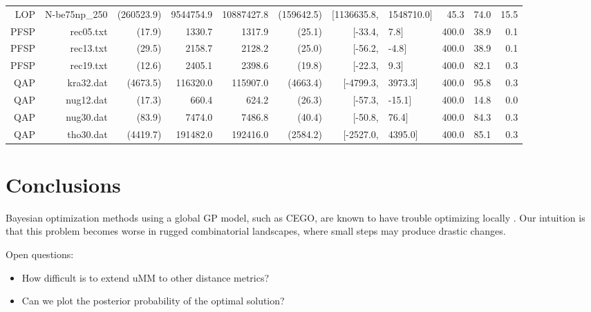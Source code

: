 \documentclass[runningheads]{llncs}
\begin{document}
\begin{table}[tb]
{\begin{tabular}{*{6}{r}rl*{3}{r}}
    LOP     & N-be75np\_250    & (260523.9)      & 9544754.9        & 10887427.8              & (159642.5) & $[$1136635.8, & 1548710.0$]$  & 45.3 & 74.0 & 15.5 \\
   PFSP     & rec05.txt        & (17.9)          & 1330.7           & 1317.9                  & (25.1)     & $[$-33.4,     & 7.8$]$        & 400.0& 38.9 & 0.1  \\
   PFSP     & rec13.txt        & (29.5)          & 2158.7           & 2128.2                  & (25.0)     & $[$-56.2,     & -4.8$]$       & 400.0& 38.9 & 0.1  \\
   PFSP     & rec19.txt        & (12.6)          & 2405.1           & 2398.6                  & (19.8)     & $[$-22.3,     & 9.3$]$        & 400.0& 82.1 & 0.3  \\
    QAP     & kra32.dat        & (4673.5)        & 116320.0         & 115907.0                & (4663.4)   & $[$-4799.3,   & 3973.3$]$     & 400.0& 95.8 & 0.3  \\
    QAP     & nug12.dat        & (17.3)          & 660.4            & 624.2                   & (26.3)     & $[$-57.3,     & -15.1$]$      & 400.0& 14.8 & 0.0  \\
    QAP     & nug30.dat        & (83.9)          & 7474.0           & 7486.8                  & (40.4)     & $[$-50.8,     & 76.4$]$       & 400.0& 84.3 & 0.3  \\
    QAP     & tho30.dat        & (4419.7)        & 191482.0         & 192416.0                & (2584.2)   & $[$-2527.0,   & 4395.0$]$     & 400.0& 85.1 & 0.3  \\
\bottomrule
\end{tabular}}
\end{table}




\section{Conclusions}

Bayesian optimization methods using a global GP model, such as CEGO, are known
to have trouble optimizing locally \citep{EriPeaGar2019scalable}. Our
intuition is that this problem becomes worse in rugged combinatorial
landscapes, where small steps may produce drastic changes.

Open questions:
\begin{itemize}
\item How difficult is to extend uMM to other distance metrics?
\item Can we plot the posterior probability of the optimal solution?
\end{itemize}
\end{document}
